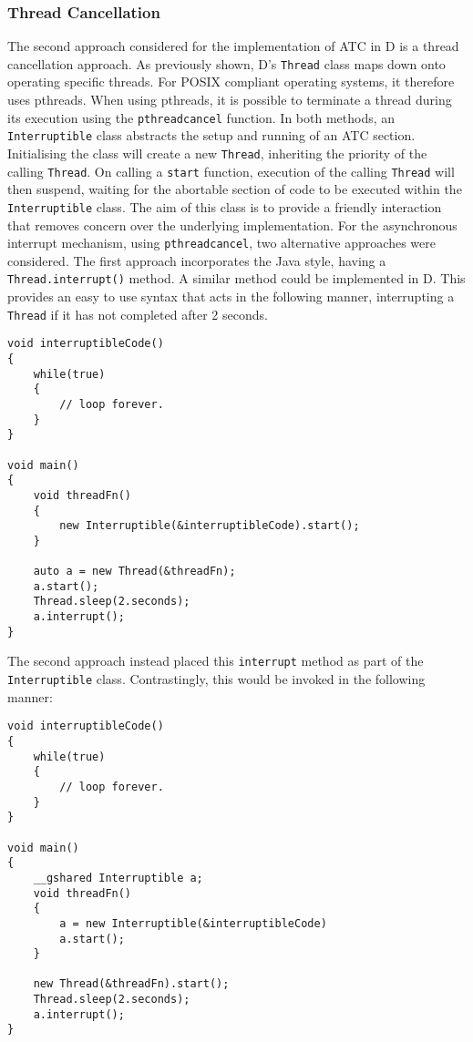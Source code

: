 \subsubsection*{Thread Cancellation}
The second approach considered for the implementation of ATC in D is a thread 
cancellation approach. As previously shown, D's \texttt{Thread} class maps down onto 
operating specific threads. For POSIX compliant operating systems, it therefore 
uses pthreads. When using pthreads, it is possible to terminate a thread during 
its execution using the \texttt{pthread\textunderscore{}cancel} function. 
In both methods, an \texttt{Interruptible} class abstracts the setup and running of an 
ATC section. 
Initialising the class will create a new \texttt{Thread}, 
inheriting the priority of the calling \texttt{Thread}. 
On calling a \texttt{start} function, execution of the calling 
\texttt{Thread} will then suspend, waiting for the abortable section 
of code to be executed within the \texttt{Interruptible} class.
The aim of this class is to provide a friendly interaction 
that removes concern over the underlying implementation. 
For the asynchronous interrupt mechanism, using
\texttt{pthread\textunderscore{}cancel},
two alternative approaches were considered.
The first approach incorporates the Java style, having a 
\texttt{Thread.interrupt()} method. A similar method could be implemented in D. 
This provides an easy to use syntax that acts in the following manner, 
interrupting a \texttt{Thread} if it has not completed after 2 seconds.
\begin{lstlisting}
void interruptibleCode()
{
    while(true)
    {
        // loop forever.
    }
}

void main()
{
    void threadFn()
    {
        new Interruptible(&interruptibleCode).start(); 
    }

    auto a = new Thread(&threadFn); 
    a.start(); 
    Thread.sleep(2.seconds); 
    a.interrupt();
}
\end{lstlisting}
The second approach instead placed this \texttt{interrupt} method as part of the 
\texttt{Interruptible} class. Contrastingly, this would be invoked in the following
manner: 
\begin{lstlisting}
void interruptibleCode()
{
    while(true)
    {
        // loop forever.
    }
}

void main()
{
    __gshared Interruptible a; 
    void threadFn()
    {
        a = new Interruptible(&interruptibleCode)
        a.start(); 
    }

    new Thread(&threadFn).start(); 
    Thread.sleep(2.seconds); 
    a.interrupt();
}
\end{lstlisting}

